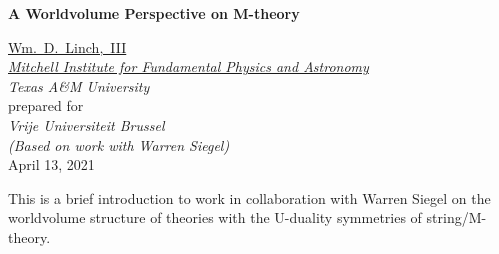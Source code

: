 


\usepackage{placeins}



{\center
{\color{violet}\fontsize{28pt}{34pt}\bf\sffamily A Worldvolume Perspective on M-theory\\[.5in]

}


\href{mailto:wdlinch3@gmail.com}{Wm.\ D.\ Linch,\ III} \\[.1in]
{\it 
\href{http://people.tamu.edu/~wdlinch3/}{
Mitchell Institute for Fundamental Physics and Astronomy}\\
Texas A\&M University\\[.1in]
}
prepared for \\[.1in]
{\it 
Vrije Universiteit Brussel\\
(Based on work with Warren Siegel)
}\\[.3in]


{\color[rgb]{0,.7,1}April 13, 2021}\\[.5in]}

{\abstract
This is a brief introduction to work \cite{Linch:2015lwa, Linch:2015fya, Linch:2015qva, Linch:2015fca, Linch:2016ipx, Linch:2017eru} in collaboration with Warren Siegel on the worldvolume structure of theories with the U-duality symmetries of string/M-theory. 
}

\vfill

\thispagestyle{empty}

{
\tableofcontents
}

